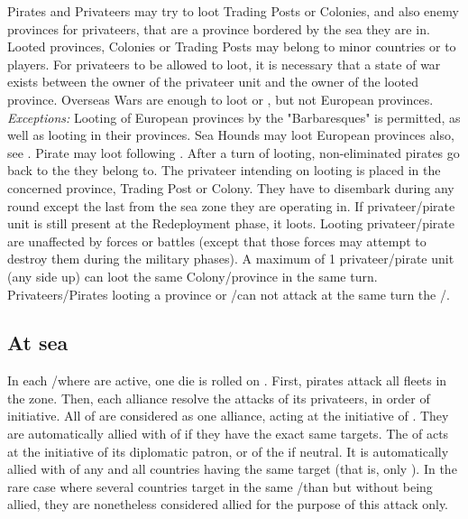 \begin{todo}
 Pirates and Privateers may try to
loot Trading Posts or Colonies, and also enemy provinces for privateers, that
are a province bordered by the sea they are in.
\bparag Looted provinces, Colonies or Trading Posts may belong to minor
countries or to players. For privateers to be allowed to loot, it is necessary
that a state of war exists between the owner of the privateer unit and the
owner of the looted province. Overseas Wars are enough to loot \TP or \COL,
but not European provinces.
\bparag \textit{Exceptions:} Looting of European provinces by the
"Barbaresques" is permitted, as well as looting in their provinces. Sea Hounds
may loot European provinces also, see .
\bparag Pirate may loot following . After a
turn of looting, non-eliminated pirates go back to the \STZ they belong to.
\bparag The privateer intending on looting is placed in the concerned
province, Trading Post or Colony. They have to disembark during any round
except the last from the sea zone they are operating in.
\bparag If privateer/pirate unit is still present at the Redeployment phase,
it loots. Looting privateer/pirate are unaffected by forces or battles (except
that those forces may attempt to destroy them during the military phases).
\bparag A maximum of 1 privateer/pirate unit (any side up) can loot the same
Colony/province in the same turn. Privateers/Pirates looting a province or
\COL/\TP can not attack at the same turn the \CTZ/\STZ.
\end{todo}

\subsection{At sea}
 In each \STZ/\CTZ where
\corsaire are active, one die is rolled on .
\bparag First, pirates attack all fleets in the zone.
\bparag Then, each alliance resolve the attacks of its privateers, in order of
initiative.
\bparag All \corsaire of \Barbaresque are considered as one
alliance, acting at the initiative of \TUR. They are automatically allied with
\corsaire of \TUR if they have the exact same targets.
\bparag The \corsaire of \paysChevaliers acts at the initiative of its
diplomatic patron, or of the \SDCF if neutral. It is automatically allied with
\corsaire of any and all countries having the same target (that is, only
\TUR). 
\bparag In the rare case where several countries target \TUR in the same
\STZ/\CTZ than \paysChevaliers but without being allied, they are nonetheless
considered allied for the purpose of this attack only.

